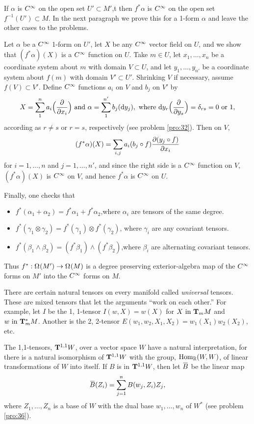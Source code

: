 \documentclass[../main]{subfiles}
\begin{document}
If $\alpha$ is $\CInfty$ on the open set $U' \subset M'$,t then $f^\ast \alpha$ is $\CInfty$ on the open set $f^{-1}(U')\subset M$. In the next paragraph we prove this for a 1-form $\alpha$ and leave the other cases to the problems.

Let $\alpha$ be a $\CInfty$ 1-form on $U'$, let $X$ be any $\CInfty$ vector field on $U$, and we show that $(f^\ast\alpha)(X)$ is a $\CInfty$ function on $U$. Take $m\in U$, let $x_1,\dots,x_n$ be a coordinate system about $m$ with domain $V\subset U$, and let $y_1,\dots,y_{n'}$ be a coordinate system about $f(m)$ with domain $V'\subset U'$. Shrinking $V$ if necessary, assume $f(V)\subset V'$. Define $\CInfty$ functions $a_i$ on $V$ and $b_j$ on $V'$ by \[X = \sum_1^n a_i\Big(\pdv{}{x_i}\Big)\text{ and }\alpha = \sum_{1}^{n'} b_j(\dd y_j),\text{ where }\dd y_r\Big(\pdv{}{y_s}\Big) = \delta_{rs} = 0\text{ or }1,\] according as $r\ne s$ or $r=s$, respectively (see problem \ref{pro:32}). Then on $V$,
\[ (f^\ast \alpha)(X) = \sum_{i,j} a_i(b_j\circ f)\pdv{(y_j\circ f)}{x_i} \]
for $i=1,\dots, n$ and $j=1,\dots,n'$, and since the right side is a $\CInfty$ function on $V$, $(f^\ast \alpha)(X)$ is $\CInfty$ on $V$, and hence $f^*\alpha$ is $\CInfty$ on $U$.

Finally, one checks that
\begin{itemize}
    \item $ f^\ast(\alpha_1+\alpha_2) = f^\ast\alpha_1 +f^\ast\alpha_2$,where $\alpha_i$ are tensors of the same degree.
    \item $f^\ast(\gamma_1 \otimes \gamma_2) = f^\ast (\gamma_1) \otimes f^\ast (\gamma_2)$, where $\gamma_i$ are any covariant tensors.
    \item $f^\ast(\beta_1\wedge\beta_2) = (f^\ast\beta_1) \wedge (f^\ast \beta_2)$,where $\beta_i$ are alternating covariant tensors.
\end{itemize}
Thus $f^\ast:\formbundle{M'}{} \functionMaps \formbundle{M}{}$ is a degree preserving exterior-algebra map of the $\CInfty$ forms on $M'$ into the $\CInfty$ forms on $M$.

There are certain natural tensors on every manifold called \emph{universal} tensors. These are mixed tensors that let the arguments ``work on each other.'' For example, let $I$ be the 1, 1-tensor $I(w,X) = w(X)$ for $X \InText \tangentspace{M}{m}$ and $w \InText \cotangentspace{M}{m}$. Another is the 2, 2-tensor $E(w_1,w_2,X_1,X_2) = w_1(X_1)w_2(X_2)$, etc.

The 1,1-tensors, $\tensorbundle{W}{1}{ 1}$, over a vector space $W$ have a natural interpretation, for there is a natural isomorphism of $\tensorbundle{W}{1}{1}$ with the group, $\Hom_\bR(W,W)$, of linear transformations of $W$ into itself. If $B$ is in $\tensorbundle{W}{1}{ 1}$, then let $\xoverline B$ be the linear map \[\xoverline B(Z_i) = \sum_{j=1}^n B(w_j, Z_i)Z_j,\] where $Z_1,\dots,Z_n$ is a base of $W$ with the dual base $w_1,\dots,w_n$ of $W^*$ (see problem \ref{pro:36}).
\end{document}
